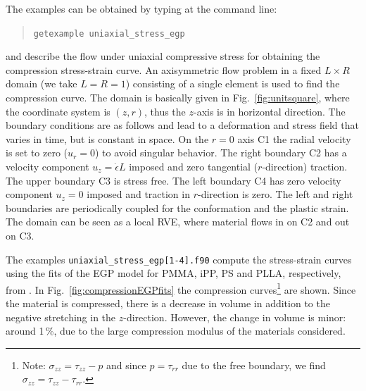 \label{sec:uniaxialegp}
The examples can be obtained by typing at the command line:
\begin{quote}
   \texttt{getexample uniaxial\_stress\_egp}
\end{quote}
and describe the flow under uniaxial compressive stress for obtaining the compression stress-strain curve. An axisymmetric flow problem in a fixed $L\times R$ domain (we take $L=R=1$) consisting of a single element is used to find the compression curve. The domain is basically given in Fig.~\ref{fig:unitsquare}, where the coordinate system is $(z,r)$, thus the $z$-axis is in horizontal direction. The boundary conditions are as follows and lead to a deformation and stress field that varies in time, but is constant in space.
On the $r=0$ axis C1 the radial velocity is set to zero ($u_r=0$) to avoid singular behavior.
The right boundary C2 has a velocity component $u_z=\dot\epsilon L$ imposed and zero tangential ($r$-direction) traction. 
The upper boundary C3 is stress free. The left boundary C4 has zero velocity component $u_z=0$ imposed and traction in $r$-direction is zero. 
The left and right boundaries are periodically coupled for the conformation and the plastic strain.
The domain can be seen as a local RVE, where material flows in on C2 and out on C3.

The examples \texttt{uniaxial\_stress\_egp[1-4].f90} compute the stress-strain curves using the fits of the EGP model for PMMA, iPP, PS and PLLA, respectively, from \cite{van_breemen_rate_2012}. In Fig.~\ref{fig:compressionEGPfits} the compression curves\footnote{Note: $\sigma_{zz}=\tau_{zz}-p$ and 
since $p=\tau_{rr}$ due to the free boundary, we find $\sigma_{zz}=\tau_{zz}-\tau_{rr}$.}
 are shown. Since the material is compressed, there is a decrease in volume in addition to the negative stretching in the $z$-direction. However, the change in volume is minor: around 1\,\%, due to the large compression modulus of the materials considered.

